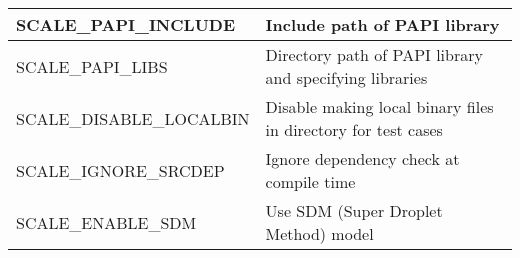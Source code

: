 \begin{table}[htb]
\begin{center}
\begin{tabularx}{150mm}{|l|X|}
 SCALE\_PAPI\_INCLUDE     & Include path of PAPI library  \\ \hline
 SCALE\_PAPI\_LIBS        & Directory path of PAPI library and specifying libraries  \\ \hline
 SCALE\_DISABLE\_LOCALBIN & Disable making local binary files in directory for test cases  \\ \hline
 SCALE\_IGNORE\_SRCDEP    & Ignore dependency check at compile time  \\ \hline
 SCALE\_ENABLE\_SDM       & Use SDM (Super Droplet Method) model  \\ \hline
\end{tabularx}
\label{tab:env_var_list}
\end{center}
\end{table}



